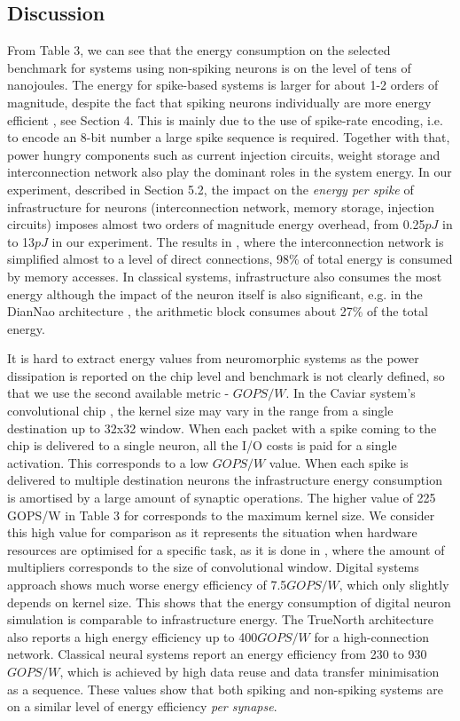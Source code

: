 \documentclass[conference, compsoc]{IEEEtran}
\begin{document}
\subsection{Discussion}
From Table 3, we can see that the energy consumption on the selected benchmark for systems using non-spiking neurons is on the level of tens of nanojoules. The energy for spike-based systems is larger for about 1-2 orders of magnitude, despite the fact that spiking neurons individually are more energy efficient , see Section 4. This is mainly due to the use of spike-rate encoding, i.e. to encode an 8-bit number a large spike sequence is required. Together with that, power hungry components such as current injection circuits, weight storage and interconnection network also play the dominant roles in the system energy. In our experiment, described in Section 5.2, the impact on the \textit{energy per spike} of infrastructure for neurons (interconnection network, memory storage, injection circuits) imposes almost two orders of magnitude energy overhead, from 0.25$ pJ $ in \cite{Phong} to 13$ pJ $ in our experiment. The results in \cite{12p}, where the interconnection network is simplified almost to a level of direct connections, 98\% of total energy is consumed by memory accesses. In classical systems, infrastructure also consumes the most energy although the impact of the neuron itself is also significant, e.g. in the DianNao architecture \cite{DianNao}, the arithmetic block consumes about 27\% of the total energy.

It is hard to extract energy values from neuromorphic systems \cite{DVS_analog,CAVIAR,DVS_digital} as the power dissipation is reported on the chip level and benchmark is not clearly defined, so that we use the second available metric - $ GOPS/W $. In the Caviar system’s convolutional chip \cite{DVS_analog,CAVIAR}, the kernel size may vary in the range from a single destination up to 32x32 window. When each packet with a spike coming to the chip is delivered to a single neuron, all the I/O costs is paid for a single activation. This corresponds to a low $ GOPS/W $ value. When each spike is delivered to multiple destination neurons the infrastructure energy consumption is amortised by a large amount of synaptic operations. The higher value of 225 GOPS/W in Table 3 for \cite{DVS_analog,CAVIAR} corresponds to the maximum kernel size. We consider this high value for comparison as it represents the situation when hardware resources are optimised for a specific task, as it is done in \cite{HWCE,Origami}, where the amount of multipliers corresponds to the size of convolutional window. Digital systems approach \cite{DVS_digital} shows much worse energy efficiency of 7.5$ GOPS/W $, which only slightly depends on kernel size. This shows that the energy consumption of digital neuron simulation is comparable to infrastructure energy. The TrueNorth architecture \cite{TrueNorth} also reports a high energy efficiency up to 400$ GOPS/W $ for a high-connection network. Classical neural systems report an energy efficiency from 230 to 930$ GOPS/W $, which is achieved by high data reuse and data transfer minimisation as a sequence. These values show that both spiking and non-spiking systems are on a similar level of energy efficiency \textit{per synapse}.
\end{document}
